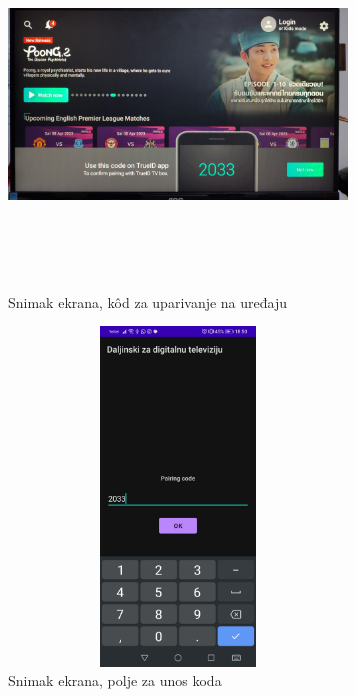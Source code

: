 \documentclass[implementacija.tex]{subfiles}
\begin{document}
\begin{figure}[h!]
\centering
\begin{minipage}{.6\textwidth}
 \centering
  \includegraphics[width=9cm,height=9cm,keepaspectratio]{Implementacija/snimci_ekrana/8_kod_za_uparivanje_na_stb.jpg}
  \caption{Snimak ekrana, k\^{o}d za uparivanje na uređaju}
  \label{fig:kod_na_stb}
\end{minipage}%
\begin{minipage}{.4\textwidth}
   \centering
  \includegraphics[width=9cm,height=9cm,keepaspectratio]{Implementacija/snimci_ekrana/7_unos_koda_za_uparivanje.jpg}
  \caption{Snimak ekrana, polje za unos koda}
   \label{fig:kod_na_mobilnom}
\end{minipage}
\end{figure}
\end{document}
